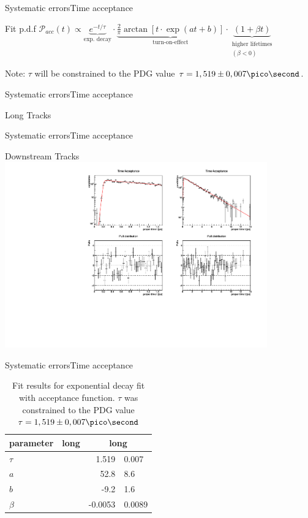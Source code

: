 \documentclass{beamer}
\begin{document}
\begin{frame}{Systematic errors}{Time acceptance}
    \begin{block}{Fit p.d.f}
    $\mathcal{P}_{acc}(t) \propto \underbrace{e^{-t/\tau}}_{\text{exp. decay}} \cdot \underbrace{\frac{2}{\pi}\arctan[t\cdot \exp(at+b)]}_{\text{turn-on-effect}} \cdot \underbrace{(1 + \beta t)}_{\substack{\text{higher lifetimes} \\(\beta<0)}}$
    \end{block}
    \begin{alert}{Note:}
    $\tau$ will be constrained to the PDG value $\tau = 1,519 \pm 0,007 \pico\second$.
    \end{alert}
\end{frame}

\begin{frame}{Systematic errors}{Time acceptance}
\begin{block}{Long Tracks}
\end{block}
\end{frame}

\begin{frame}{Systematic errors}{Time acceptance}
\begin{block}{Downstream Tracks}
\centering
\includegraphics[width=0.85\textwidth]{time_acceptance_fit_ds}
\end{block}
\end{frame}

\begin{frame}{Systematic errors}{Time acceptance}
\begin{table}
\caption{Fit results for exponential decay fit with acceptance function. $\tau$ was constrained to the PDG value $\tau = 1,519 \pm 0,007 \pico\second$}
\begin{tabular}{lr@{$\pm$}l r@{$\pm$}l}
\hline \hline 
parameter & \multicolumn{2}{c}{long} & \multicolumn{2}{c}{long} \\ \hline
$\tau$    & & &  1.519   & 0.007 \\
$a$       & & &  52.8    & 8.6 \\
$b$       & & &  -9.2    & 1.6 \\
$\beta$   & & &  -0.0053 & 0.0089 \\ 
\hline \hline
\end{tabular}
\end{table}
\end{frame}
\end{document}
